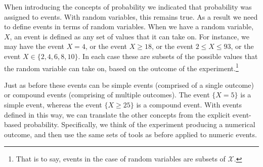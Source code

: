\documentclass[
  letterpaper,
  DIV=11,
  numbers=noendperiod]{scrreprt}
\theoremstyle{definition}
\theoremstyle{definition}
\theoremstyle{definition}
\theoremstyle{remark}
\begin{document}
When introducing the concepts of probability we indicated that
probability was assigned to events. With random variables, this remains
true. As a result we need to define events in terms of random variables.
When we have a random variable, \(X\), an event is defined as any set of
values that it can take on. For instance, we may have the event \(X=4\),
or the event \(X \geq 18\), or the event \(2 \leq X \leq 93\), or the
event \(X \in \{2,4,6,8,10\}\). In each case these are subsets of the
possible values that the random variable can take on, based on the
outcome of the experiment.\footnote{That is to say, events in the case
  of random variables are subsets of \(\mathcal{X}\).}

Just as before these events can be simple events (comprised of a single
outcome) or compound events (comprising of multiple outcomes). The event
\(\{X=5\}\) is a simple event, whereas the event \(\{X \geq 25\}\) is a
compound event. With events defined in this way, we can translate the
other concepts from the explicit event-based probability. Specifically,
we think of the experiment producing a numerical outcome, and then use
the same sets of tools as before applied to numeric events.
\end{document}
